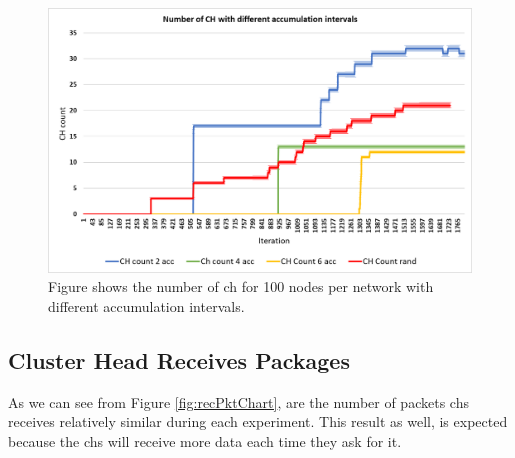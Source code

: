 \documentclass[USenglish]{uit-thesis}
\begin{document}

\begin{figure}
\centering
\includegraphics[width=\textwidth]{CH_count_stdev.png}
\caption{Figure shows the number of \gls{ch} for 100 nodes per network with different accumulation intervals.}
\label{fig:chCountChart}
\end{figure}


\newpage

\subsection{Cluster Head Receives Packages}

As we can see from Figure \ref{fig:recPktChart}, are the number of packets \glspl{ch} receives relatively similar during each experiment. This result as well, is expected because the \glspl{ch} will receive more data each time they ask for it.

\end{document}

